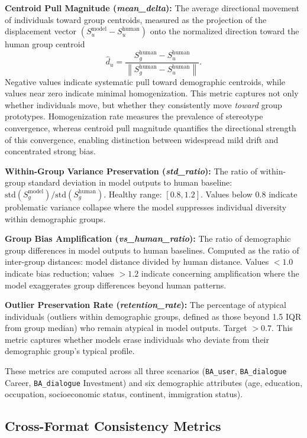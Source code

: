 \documentclass[11pt,a4paper]{article}
\newcommand{\paratitle}[1]{\smallskip\noindent\textbf{#1}}
\begin{document}
\paratitle{Centroid Pull Magnitude (\textit{mean\_delta}):}
The average directional movement of individuals toward group centroids, measured as the projection of the displacement vector $(S_u^{\text{model}} - S_u^{\text{human}})$ onto the normalized direction toward the human group centroid
\[
\hat{d}_u = \frac{S_g^{\text{human}} - S_u^{\text{human}}}{\left\| S_g^{\text{human}} - S_u^{\text{human}} \right\|}.
\]
Negative values indicate systematic pull toward demographic centroids, while values near zero indicate minimal homogenization. This metric captures not only whether individuals move, but whether they consistently move \textit{toward} group prototypes. Homogenization rate measures the prevalence of stereotype convergence, whereas centroid pull magnitude quantifies the directional strength of this convergence, enabling distinction between widespread mild drift and concentrated strong bias.


\paratitle{Within-Group Variance Preservation (\textit{std\_ratio}):}
The ratio of within-group standard deviation in model outputs to human baseline: $\text{std}(S_g^{\text{model}}) / \text{std}(S_g^{\text{human}})$. Healthy range: $[0.8, 1.2]$. Values below 0.8 indicate problematic variance collapse where the model suppresses individual diversity within demographic groups.

\paratitle{Group Bias Amplification (\textit{vs\_human\_ratio}):}
The ratio of demographic group differences in model outputs to human baselines. Computed as the ratio of inter-group distances: model distance divided by human distance. Values $< 1.0$ indicate bias reduction; values $> 1.2$ indicate concerning amplification where the model exaggerates group differences beyond human patterns.

\paratitle{Outlier Preservation Rate (\textit{retention\_rate}):}
The percentage of atypical individuals (outliers within demographic groups, defined as those beyond 1.5 IQR from group median) who remain atypical in model outputs. Target $> 0.7$. This metric captures whether models erase individuals who deviate from their demographic group's typical profile.

These metrics are computed across all three scenarios (\texttt{BA\_user}, \texttt{BA\_dialogue} Career, \texttt{BA\_dialogue} Investment) and six demographic attributes (age, education, occupation, socioeconomic status, continent, immigration status).

\subsection{Cross-Format Consistency Metrics}
\label{sec:consistency_distance}
\end{document}
